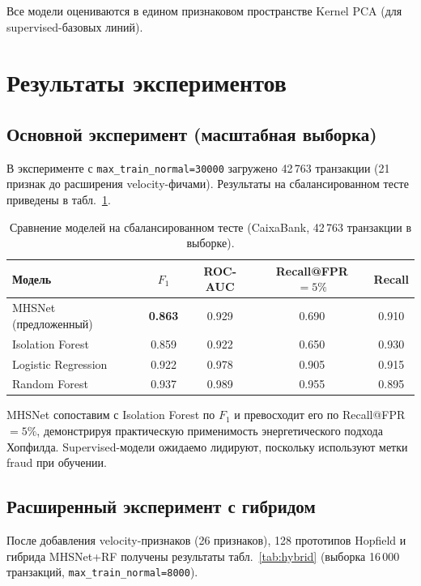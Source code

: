 \documentclass[12pt,a4paper]{article}
\begin{document}
Все модели оцениваются в едином признаковом пространстве Kernel PCA (для supervised-базовых линий).

\section{Результаты экспериментов}
\label{sec:results}

\subsection{Основной эксперимент (масштабная выборка)}

В эксперименте с \texttt{max\_train\_normal=30000} загружено 42\,763 транзакции
(21 признак до расширения velocity-фичами). Результаты на сбалансированном тесте
приведены в табл.~\ref{tab:main}.

\begin{table}[ht]
  \centering
  \caption{Сравнение моделей на сбалансированном тесте (CaixaBank, 42\,763 транзакции в выборке).}
  \label{tab:main}
  \begin{tabular}{lcccc}
    \toprule
    Модель & $F_1$ & ROC-AUC & Recall@FPR$=5\%$ & Recall \\
    \midrule
    MHSNet (предложенный) & \textbf{0.863} & 0.929 & 0.690 & 0.910 \\
    Isolation Forest      & 0.859 & 0.922 & 0.650 & 0.930 \\
    Logistic Regression   & 0.922 & 0.978 & 0.905 & 0.915 \\
    Random Forest         & 0.937 & 0.989 & 0.955 & 0.895 \\
    \bottomrule
  \end{tabular}
\end{table}

MHSNet сопоставим с Isolation Forest по $F_1$ и превосходит его по Recall@FPR$=5\%$,
демонстрируя практическую применимость энергетического подхода Хопфилда.
Supervised-модели ожидаемо лидируют, поскольку используют метки fraud при обучении.

\subsection{Расширенный эксперимент с гибридом}

После добавления velocity-признаков (26 признаков), 128 прототипов Hopfield и гибрида MHSNet+RF
получены результаты табл.~\ref{tab:hybrid} (выборка 16\,000 транзакций, \texttt{max\_train\_normal=8000}).
\end{document}
